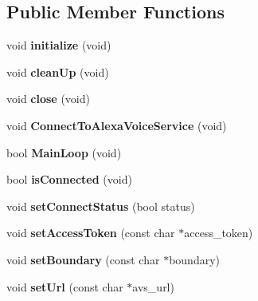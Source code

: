 \subsection*{Public Member Functions}
\begin{DoxyCompactItemize}
\item 
\mbox{\label{classAVS_1_1Controller_a35fd93cff51dce15b86c8b08819fcb40}} 
void {\bfseries initialize} (void)
\item 
\mbox{\label{classAVS_1_1Controller_ae64da1267c843af2d4ff9b06d7a97905}} 
void {\bfseries clean\+Up} (void)
\item 
\mbox{\label{classAVS_1_1Controller_ad3df185f7f937b94265928a58f54d197}} 
void {\bfseries close} (void)
\item 
\mbox{\label{classAVS_1_1Controller_af9626aeea51e23d5845d2e7ff7026c6c}} 
void {\bfseries Connect\+To\+Alexa\+Voice\+Service} (void)
\item 
\mbox{\label{classAVS_1_1Controller_aa64505b95519a4a1eb81a9492a531772}} 
bool {\bfseries Main\+Loop} (void)
\item 
\mbox{\label{classAVS_1_1Controller_aa34512feae76b3fc453a3f2d826bb9a2}} 
bool {\bfseries is\+Connected} (void)
\item 
\mbox{\label{classAVS_1_1Controller_a68d1b8afbded9ff782cd13ad45da73b8}} 
void {\bfseries set\+Connect\+Status} (bool status)
\item 
\mbox{\label{classAVS_1_1Controller_a01f1dba8c1938f50caa7569f15edf5ba}} 
void {\bfseries set\+Access\+Token} (const char $\ast$access\+\_\+token)
\item 
\mbox{\label{classAVS_1_1Controller_ab3a25dbb190b8378d4e60937823bd68c}} 
void {\bfseries set\+Boundary} (const char $\ast$boundary)
\item 
\mbox{\label{classAVS_1_1Controller_a0654f81a365b159cb1dc13124b4b1c46}} 
void {\bfseries set\+Url} (const char $\ast$avs\+\_\+url)

\end{DoxyCompactItemize}
